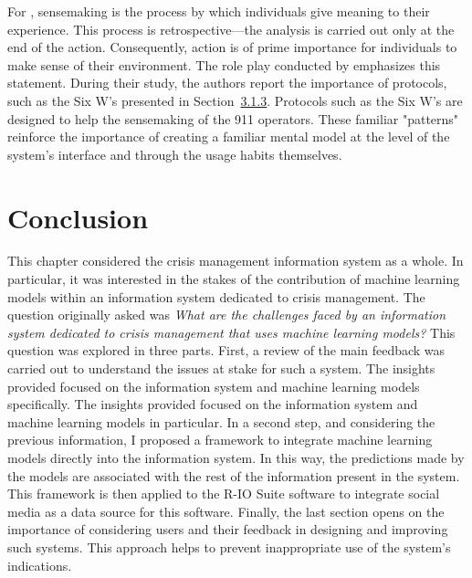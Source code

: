 For \textcite{weickSensemakingOrganizations1995}, sensemaking is the process by which individuals give meaning to their experience.
This process is retrospective—the analysis is carried out only at the end of the action.
Consequently, action is of prime importance for individuals to make sense of their environment.
The role play conducted by \textcite{graceRolePlayingNext2019} emphasizes this statement.
During their study, the authors report the importance of protocols, such as the Six W's presented in Section~\hyperref[sec:sixws]{3.1.3}.
Protocols such as the Six W's are designed to help the sensemaking of the 911 operators.
These familiar "patterns" reinforce the importance of creating a familiar mental model at the level of the system's interface and through the usage habits themselves.

\section*{Conclusion}
This chapter considered the crisis management information system as a whole.
In particular, it was interested in the stakes of the contribution of machine learning models within an information system dedicated to crisis management.
The question originally asked was
\textit{What are the challenges faced by an information system dedicated to crisis management that uses machine learning models?}
This question was explored in three parts.
First, a review of the main feedback was carried out to understand the issues at stake for such a system.
The insights provided focused on the information system and machine learning models specifically.
The insights provided focused on the information system and machine learning models in particular.
In a second step, and considering the previous information, I proposed a framework to integrate machine learning models directly into the information system.
In this way, the predictions made by the models are associated with the rest of the information present in the system.
This framework is then applied to the R-IO Suite software to integrate social media as a data source for this software.
Finally, the last section opens on the importance of considering users and their feedback in designing and improving such systems.
This approach helps to prevent inappropriate use of the system's indications.

